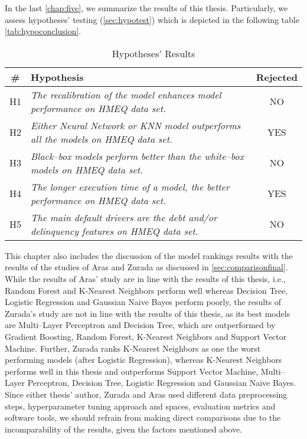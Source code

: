 In the last \autoref{chap:five}, we summarize the results of this thesis. Particularly, we assess hypotheses' testing (\autoref{sec:hypotest}) which is depicted in the following table \autoref{tab:hypoconclusion}.

\begin{table}[H]
    \small
    \setlength{\tabcolsep}{8pt}
    \centering
    \caption[Hypotheses' Results]{Hypotheses' Results}\label{tab:hypoconclusion}
    \renewcommand{\arraystretch}{1.5}
    \begin{tabular}{c p{10cm} c}
    \toprule
    \textbf{\#} & \textbf{Hypothesis} & \textbf{Rejected} \\
    \midrule
    \hline
    H1 & \textit{The recalibration of the model enhances model performance on HMEQ data set.} & NO \\
    H2 & \textit{Either Neural Network or KNN model outperforms all the models on HMEQ data set.} & YES \\
    H3 & \textit{Black--box models perform better than the white--box models on HMEQ data set.} & NO \\
    H4 & \textit{The longer execution time of a model, the better performance on HMEQ data set.} & YES \\
    H5 & \textit{The main default drivers are the debt and/or delinquency features on HMEQ data set.} & NO \\
    \hline
    \bottomrule
    \end{tabular}
    \vspace{0.35em}
    
    \vspace{-1em}
\end{table}

This chapter also includes the discussion of the model rankings results with the results of the studies of Aras \citep{serkan2021bagging} and Zurada \citep{zurada2014classification} as discussed in \autoref{sec:comparisonfinal}.
While the results of Aras' study are in line with the results of this thesis, i.e., Random Forest and K-Nearest Neighbors perform well whereas Decision Tree, Logistic Regression and Gaussian Naive Bayes perform poorly,
the results of Zurada's study are not in line with the results of this thesis, as its best models are Multi--Layer Perceptron and Decision Tree, which are outperformed by Gradient Boosting, Random Forest, K-Nearest Neighbors and Support Vector Machine.
Further, Zurada ranks K-Nearest Neighbors as one the worst performing models (after Logistic Regression), whereas K-Nearest Neighbors performs well in this thesis and outperforms Support Vector Machine, Multi--Layer Perceptron, Decision Tree, Logistic Regression and Gaussian Naive Bayes.
Since either thesis' author, Zurada and Aras used different data preprocessing steps, hyperparameter tuning approach and spaces, evaluation metrics and software tools, we should refrain from making direct comparisons due to the incomparability of the results, given the factors mentioned above.

